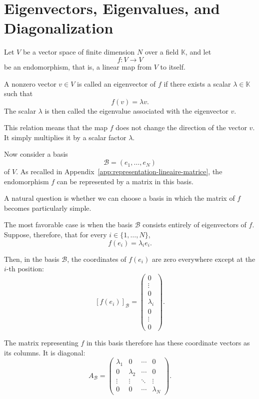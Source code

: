 \chapter{Eigenvectors, Eigenvalues, and Diagonalization}
\label{app:vecteurs-propres-diagonalisation}

Let $V$ be a vector space of finite dimension $N$ over a field $\mathbb{K}$, and let
\[
f : V \rightarrow V
\]
be an endomorphism, that is, a linear map from $V$ to itself.

A nonzero vector $v \in V$ is called an eigenvector of $f$ if there exists a scalar
$\lambda \in \mathbb{K}$ such that
\[
f(v) = \lambda v.
\]
The scalar $\lambda$ is then called the eigenvalue associated with the eigenvector $v$.

This relation means that the map $f$ does not change the direction of the vector $v$.
It simply multiplies it by a scalar factor $\lambda$.

Now consider a basis
\[
\mathcal{B} = (e_1,\dots,e_N)
\]
of $V$. As recalled in Appendix~\ref{app:representation-lineaire-matrice},
the endomorphism $f$ can be represented by a matrix in this basis.

A natural question is whether we can choose a basis in which the matrix
of $f$ becomes particularly simple.

The most favorable case is when the basis $\mathcal{B}$ consists entirely of
eigenvectors of $f$. Suppose, therefore, that for every $i \in \{1,\dots,N\}$,
\[
f(e_i) = \lambda_i e_i.
\]

Then, in the basis $\mathcal{B}$, the coordinates of $f(e_i)$ are zero everywhere except at the
$i$-th position:
\[
[f(e_i)]_{\mathcal{B}}
=
\begin{pmatrix}
0 \\
\vdots \\
0 \\
\lambda_i \\
0 \\
\vdots \\
0
\end{pmatrix}.
\]

The matrix representing $f$ in this basis therefore has these coordinate vectors as its columns.
It is diagonal:
\[
A_{\mathcal{B}}
=
\begin{pmatrix}
\lambda_1 & 0         & \cdots & 0 \\
0         & \lambda_2 & \cdots & 0 \\
\vdots    & \vdots    & \ddots & \vdots \\
0         & 0         & \cdots & \lambda_N
\end{pmatrix}.
\]

